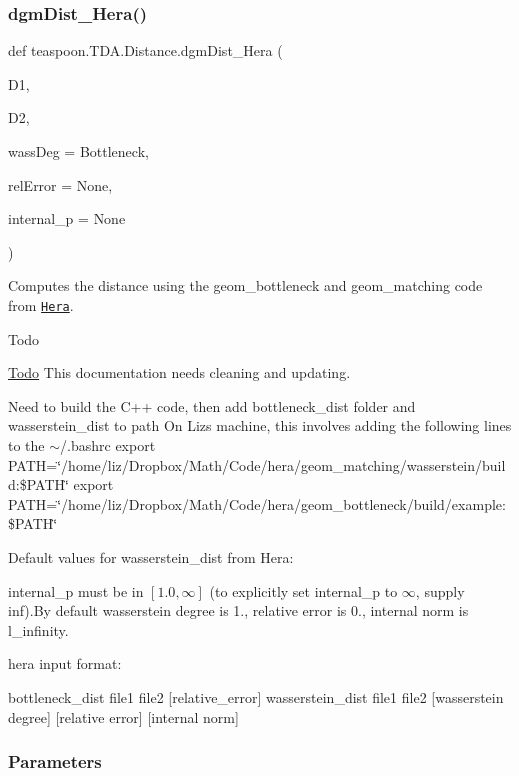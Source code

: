 \subsubsection{\texorpdfstring{dgm\+Dist\+\_\+\+Hera()}{dgmDist\_Hera()}}
{\footnotesize\ttfamily def teaspoon.\+T\+D\+A.\+Distance.\+dgm\+Dist\+\_\+\+Hera (\begin{DoxyParamCaption}\item[{}]{D1,  }\item[{}]{D2,  }\item[{}]{wass\+Deg = {\ttfamily \textquotesingle{}Bottleneck\textquotesingle{}},  }\item[{}]{rel\+Error = {\ttfamily None},  }\item[{}]{internal\+\_\+p = {\ttfamily None} }\end{DoxyParamCaption})}



Computes the distance using the geom\+\_\+bottleneck and geom\+\_\+matching code from \href{https://bitbucket.org/grey_narn/hera}{\tt Hera}. 

\begin{DoxyRefDesc}{Todo}
\item[\hyperlink{todo__todo000001}{Todo}]This documentation needs cleaning and updating.\end{DoxyRefDesc}


Need to build the C++ code, then add bottleneck\+\_\+dist folder and wasserstein\+\_\+dist to path On Liz\textquotesingle{}s machine, this involves adding the following lines to the $\sim$/.bashrc export P\+A\+TH=\char`\"{}/home/liz/\+Dropbox/\+Math/\+Code/hera/geom\+\_\+matching/wasserstein/build\+:\$\+P\+A\+T\+H\char`\"{} export P\+A\+TH=\char`\"{}/home/liz/\+Dropbox/\+Math/\+Code/hera/geom\+\_\+bottleneck/build/example\+:\$\+P\+A\+T\+H\char`\"{}

Default values for wasserstein\+\_\+dist from Hera\+:

internal\+\_\+p must be in $[1.0, \infty]$ (to explicitly set internal\+\_\+p to $\infty$, supply inf).By default wasserstein degree is 1., relative error is 0., internal norm is l\+\_\+infinity.

hera input format\+: 
\begin{DoxyCode}
bottleneck\_dist file1 file2  [relative\_error]
wasserstein\_dist file1 file2  [wasserstein degree] [relative error] [internal norm] 
\end{DoxyCode}


\subsubsection*{Parameters }



